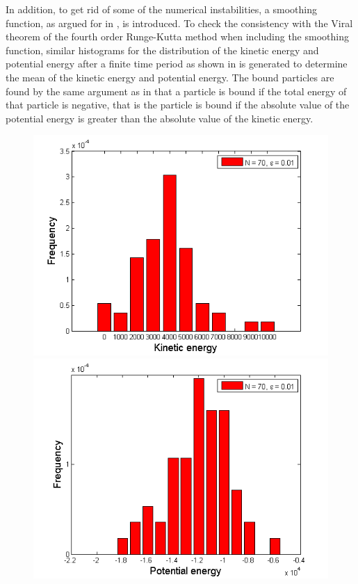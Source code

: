 In addition, to get rid of some of the numerical instabilities, a smoothing function, as argued for in , is introduced.
To check the consistency with the Viral theorem of the fourth order Runge-Kutta method when including the smoothing function, similar histograms for the distribution of the kinetic energy and potential energy after a finite time period as shown in  is generated to determine the mean of the kinetic energy and potential energy.
The bound particles are found by the same argument as in  that a particle is bound if the total energy of that particle is negative, that is the particle is bound if the absolute value of the potential energy is greater than the absolute value of the kinetic energy.
\begin{figure}[H]
\centering
\begin{minipage}{.5\textwidth}
  \centering
  \includegraphics[width=1\linewidth]{Figures/Histograms_including_epsilon/N_70_e_n3_kin.png}
\end{minipage}%
\begin{minipage}{.5\textwidth}
  \centering
  \includegraphics[width=1\linewidth]{Figures/Histograms_including_epsilon/N_70_e_n3_pot.png}

\end{minipage}
\end{figure}
